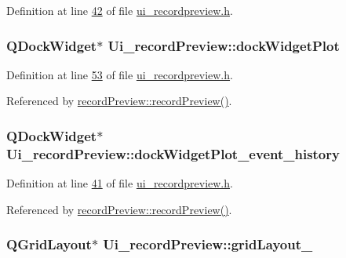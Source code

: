 Definition at line \hyperlink{a00053_source_l00042}{42} of file \hyperlink{a00053_source}{ui\+\_\+recordpreview.\+h}.

\hypertarget{a00028_a07b76f17803ec09e0367b72938bbd097}{
\subsubsection[{dock\+Widget\+Plot}]{\setlength{\rightskip}{0pt plus 5cm}Q\+Dock\+Widget$\ast$ Ui\+\_\+record\+Preview\+::dock\+Widget\+Plot}}\label{a00028_a07b76f17803ec09e0367b72938bbd097}


Definition at line \hyperlink{a00053_source_l00053}{53} of file \hyperlink{a00053_source}{ui\+\_\+recordpreview.\+h}.



Referenced by \hyperlink{a00042_source_l00011}{record\+Preview\+::record\+Preview()}.

\hypertarget{a00028_a2a8f7ee8d4458dd20481c8a1c29ce185}{
\subsubsection[{dock\+Widget\+Plot\+\_\+event\+\_\+history}]{\setlength{\rightskip}{0pt plus 5cm}Q\+Dock\+Widget$\ast$ Ui\+\_\+record\+Preview\+::dock\+Widget\+Plot\+\_\+event\+\_\+history}}\label{a00028_a2a8f7ee8d4458dd20481c8a1c29ce185}


Definition at line \hyperlink{a00053_source_l00041}{41} of file \hyperlink{a00053_source}{ui\+\_\+recordpreview.\+h}.



Referenced by \hyperlink{a00042_source_l00011}{record\+Preview\+::record\+Preview()}.

\hypertarget{a00028_a4edfeb379ee365973f74b0e422fd9916}{
\subsubsection[{grid\+Layout\+\_\+3}]{\setlength{\rightskip}{0pt plus 5cm}Q\+Grid\+Layout$\ast$ Ui\+\_\+record\+Preview\+::grid\+Layout\+\_}}\label{a00028_a4edfeb379ee365973f74b0e422fd9916}


